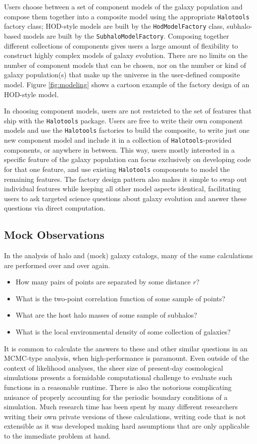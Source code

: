 \documentclass[twocolumn, tighten]{aastex6}
\newcommand{\bit}{\begin{itemize}}
\newcommand{\eit}{\end{itemize}}
\begin{document}
Users choose between a set of component models of the galaxy population and compose them together into a composite model using the appropriate {\tt Halotools} factory class; HOD-style models are built by the {\tt HodModelFactory} class, subhalo-based models are built by the {\tt SubhaloModelFactory}. Composing together different collections of components gives users a large amount of flexibility to construct highly complex models of galaxy evolution. There are no limits on the number of component models that can be chosen, nor on the number or kind of galaxy population(s) that make up the universe in the user-defined composite model. Figure \ref{fig:modeling} shows a cartoon example of the factory design of an HOD-style model.

In choosing component models, users are not restricted to the set of features that ship with the {\tt Halotools} package. Users are free to write their own component models and use the {\tt Halotools} factories to build the composite, to write just one new component model and include it in a collection of {\tt Halotools}-provided components, or anywhere in between. This way, users mostly interested in a specific feature of the galaxy population can focus exclusively on developing code for that one feature, and use existing {\tt Halotools} components to model the remaining features. The factory design pattern also makes it simple to swap out individual features while keeping all other model aspects identical, facilitating users to ask targeted science questions about galaxy evolution and answer these questions via direct computation.

\subsection{Mock Observations}
\label{subsection:mock_observables}


In the analysis of halo and (mock) galaxy catalogs, many of the same calculations are performed over and over again.
\bit
\item How many pairs of points are separated by some distance $r$?
\item What is the two-point correlation function of some sample of points?
\item What are the host halo masses of some sample of subhalos?
\item What is the local environmental density of some collection of galaxies?
\eit
It is common to calculate the answers to these and other similar questions in an MCMC-type analysis, when high-performance is paramount. Even outside of the context of likelihood analyses, the sheer size of present-day cosmological simulations presents a formidable computational challenge to evaluate such functions in a reasonable runtime. There is also the notorious complicating nuisance of properly accounting for the periodic boundary conditions of a simulation. Much research time has been spent by many different researchers writing their own private versions of these calculations, writing code that is not extensible as it was developed making hard assumptions that are only applicable to the immediate problem at hand.
\end{document}
